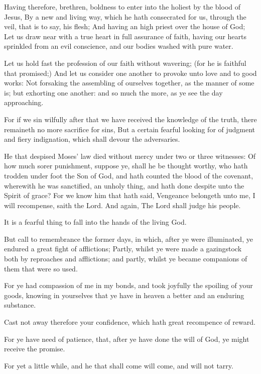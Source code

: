 \verse Having therefore, brethren, boldness to enter into the holiest by the blood of Jesus, \verse By a new and living way, which he hath consecrated for us, through the veil, that is to say, his flesh; \verse And having an high priest over the house of God; \verse Let us draw near with a true heart in full assurance of faith, having our hearts sprinkled from an evil conscience, and our bodies washed with pure water.

\verse Let us hold fast the profession of our faith without wavering; (for he is faithful that promised;) \verse And let us consider one another to provoke unto love and to good works: \verse Not forsaking the assembling of ourselves together, as the manner of some is; but exhorting one another: and so much the more, as ye see the day approaching.

\verse For if we sin wilfully after that we have received the knowledge of the truth, there remaineth no more sacrifice for sins, \verse But a certain fearful looking for of judgment and fiery indignation, which shall devour the adversaries.

\verse He that despised Moses' law died without mercy under two or three witnesses: \verse Of how much sorer punishment, suppose ye, shall he be thought worthy, who hath trodden under foot the Son of God, and hath counted the blood of the covenant, wherewith he was sanctified, an unholy thing, and hath done despite unto the Spirit of grace?  \verse For we know him that hath said, Vengeance belongeth unto me, I will recompense, saith the Lord. And again, The Lord shall judge his people.

\verse It is a fearful thing to fall into the hands of the living God.

\verse But call to remembrance the former days, in which, after ye were illuminated, ye endured a great fight of afflictions; \verse Partly, whilst ye were made a gazingstock both by reproaches and afflictions; and partly, whilst ye became companions of them that were so used.

\verse For ye had compassion of me in my bonds, and took joyfully the spoiling of your goods, knowing in yourselves that ye have in heaven a better and an enduring substance.

\verse Cast not away therefore your confidence, which hath great recompence of reward.

\verse For ye have need of patience, that, after ye have done the will of God, ye might receive the promise.

\verse For yet a little while, and he that shall come will come, and will not tarry.

